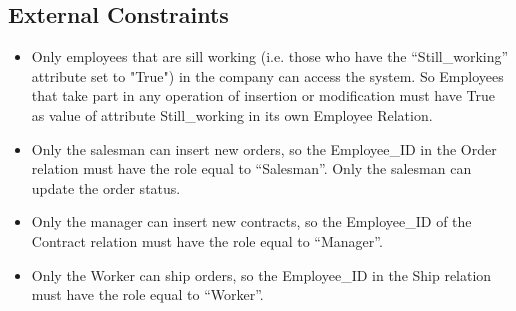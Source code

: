 \subsection{External Constraints}
\begin{itemize}
\item Only employees that are sill working (i.e. those who have the ``Still\_working'' attribute set to "True") in the company can access the system. So Employees that take part in any operation of insertion or modification must have True as value of attribute Still\_working in its own Employee Relation.
\item Only the salesman can insert new orders, so the Employee\_ID in the Order relation must have the role equal to ``Salesman''. Only the salesman can update the order status.
\item Only the manager can insert new contracts, so the Employee\_ID of the Contract relation must have the role equal to ``Manager''.
\item Only the Worker can ship orders, so the Employee\_ID in the Ship relation must have the role equal to ``Worker''.
\end{itemize}